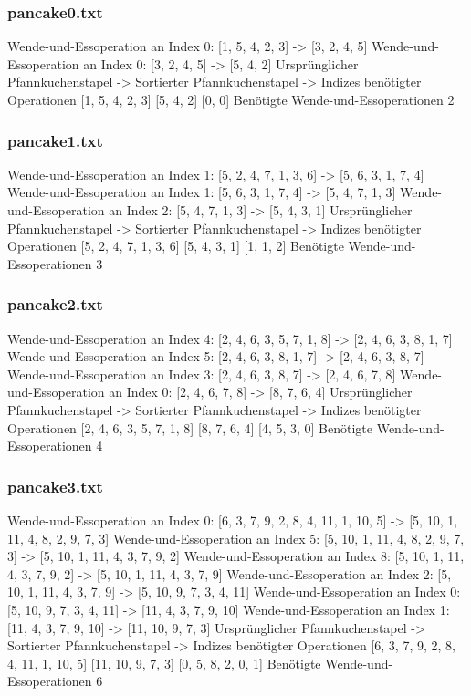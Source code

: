\subsubsection{pancake0.txt}
{\obeylines

Wende-und-Essoperation an Index 0: [1, 5, 4, 2, 3] -> [3, 2, 4, 5]
    Wende-und-Essoperation an Index 0: [3, 2, 4, 5] -> [5, 4, 2]
    Ursprünglicher Pfannkuchenstapel -> Sortierter Pfannkuchenstapel -> Indizes benötigter Operationen
    [1, 5, 4, 2, 3]
    [5, 4, 2]
    [0, 0]
    Benötigte Wende-und-Essoperationen 2
    \subsubsection{pancake1.txt}

    Wende-und-Essoperation an Index 1: [5, 2, 4, 7, 1, 3, 6] -> [5, 6, 3, 1, 7, 4]
    Wende-und-Essoperation an Index 1: [5, 6, 3, 1, 7, 4] -> [5, 4, 7, 1, 3]
    Wende-und-Essoperation an Index 2: [5, 4, 7, 1, 3] -> [5, 4, 3, 1]
    Ursprünglicher Pfannkuchenstapel -> Sortierter Pfannkuchenstapel -> Indizes benötigter Operationen
    [5, 2, 4, 7, 1, 3, 6]
    [5, 4, 3, 1]
    [1, 1, 2]
    Benötigte Wende-und-Essoperationen 3
    \subsubsection{pancake2.txt}

    Wende-und-Essoperation an Index 4: [2, 4, 6, 3, 5, 7, 1, 8] -> [2, 4, 6, 3, 8, 1, 7]
    Wende-und-Essoperation an Index 5: [2, 4, 6, 3, 8, 1, 7] -> [2, 4, 6, 3, 8, 7]
    Wende-und-Essoperation an Index 3: [2, 4, 6, 3, 8, 7] -> [2, 4, 6, 7, 8]
    Wende-und-Essoperation an Index 0: [2, 4, 6, 7, 8] -> [8, 7, 6, 4]
    Ursprünglicher Pfannkuchenstapel -> Sortierter Pfannkuchenstapel -> Indizes benötigter Operationen
    [2, 4, 6, 3, 5, 7, 1, 8]
    [8, 7, 6, 4]
    [4, 5, 3, 0]
    Benötigte Wende-und-Essoperationen 4
    \subsubsection{pancake3.txt}

    Wende-und-Essoperation an Index 0: [6, 3, 7, 9, 2, 8, 4, 11, 1, 10, 5] -> [5, 10, 1, 11, 4, 8, 2, 9, 7, 3]
    Wende-und-Essoperation an Index 5: [5, 10, 1, 11, 4, 8, 2, 9, 7, 3] -> [5, 10, 1, 11, 4, 3, 7, 9, 2]
    Wende-und-Essoperation an Index 8: [5, 10, 1, 11, 4, 3, 7, 9, 2] -> [5, 10, 1, 11, 4, 3, 7, 9]
    Wende-und-Essoperation an Index 2: [5, 10, 1, 11, 4, 3, 7, 9] -> [5, 10, 9, 7, 3, 4, 11]
    Wende-und-Essoperation an Index 0: [5, 10, 9, 7, 3, 4, 11] -> [11, 4, 3, 7, 9, 10]
    Wende-und-Essoperation an Index 1: [11, 4, 3, 7, 9, 10] -> [11, 10, 9, 7, 3]
    Ursprünglicher Pfannkuchenstapel -> Sortierter Pfannkuchenstapel -> Indizes benötigter Operationen
    [6, 3, 7, 9, 2, 8, 4, 11, 1, 10, 5]
    [11, 10, 9, 7, 3]
    [0, 5, 8, 2, 0, 1]
    Benötigte Wende-und-Essoperationen 6
}
